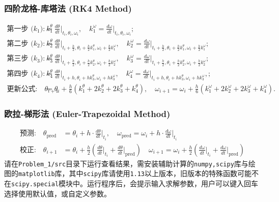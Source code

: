 \subsubsection{四阶龙格-库塔法 (RK4 Method)}

\[
\begin{aligned}
\text{第一步 (\(k_1\)):} \quad
k_1^\theta &= \frac{d\theta}{dt} \bigg|_{t_i, \theta_i, \omega_i}, \quad
k_1^\omega = \frac{d\omega}{dt} \bigg|_{t_i, \theta_i, \omega_i}; \\
\text{第二步 (\(k_2\)):} \quad
k_2^\theta &= \frac{d\theta}{dt} \bigg|_{t_i + \frac{h}{2}, \theta_i + \frac{h}{2} k_1^\theta, \omega_i + \frac{h}{2} k_1^\omega}, \quad 
k_2^\omega = \frac{d\omega}{dt} \bigg|_{t_i + \frac{h}{2}, \theta_i + \frac{h}{2} k_1^\theta, \omega_i + \frac{h}{2} k_1^\omega}; \\
\text{第三步 (\(k_3\)):} \quad
k_3^\theta &= \frac{d\theta}{dt} \bigg|_{t_i + \frac{h}{2}, \theta_i + \frac{h}{2} k_2^\theta, \omega_i + \frac{h}{2} k_2^\omega}, \quad
k_3^\omega = \frac{d\omega}{dt} \bigg|_{t_i + \frac{h}{2}, \theta_i + \frac{h}{2} k_2^\theta, \omega_i + \frac{h}{2} k_2^\omega}; \\
\text{第四步 (\(k_4\)):} \quad
k_4^\theta &= \frac{d\theta}{dt} \bigg|_{t_i + h, \theta_i + h k_3^\theta, \omega_i + h k_3^\omega}, \quad
k_4^\omega = \frac{d\omega}{dt} \bigg|_{t_i + h, \theta_i + h k_3^\theta, \omega_i + h k_3^\omega},;\\
\text{更新公式:} \quad
\theta_{i+1} &= \theta_i + \frac{h}{6} \left(k_1^\theta + 2k_2^\theta + 2k_3^\theta + k_4^\theta \right), \quad
\omega_{i+1} = \omega_i + \frac{h}{6} \left(k_1^\omega + 2k_2^\omega + 2k_3^\omega + k_4^\omega \right).
\end{aligned}
\]

\subsubsection{欧拉-梯形法 (Euler-Trapezoidal Method)}

\[
\begin{aligned}
\text{预测:} \quad
\theta_{\text{pred}} &= \theta_i + h \cdot \frac{d\theta}{dt} \bigg|_{t_i}, \quad
\omega_{\text{pred}} = \omega_i + h \cdot \frac{d\omega}{dt} \bigg|_{t_i} \\
\text{校正:} \quad
\theta_{i+1} &= \theta_i + \frac{h}{2} \left( \frac{d\theta}{dt} \bigg|_{t_i} + \frac{d\theta}{dt} \bigg|_{\text{pred}} \right) \quad
\omega_{i+1} = \omega_i + \frac{h}{2} \left( \frac{d\omega}{dt} \bigg|_{t_i} + \frac{d\omega}{dt} \bigg|_{\text{pred}} \right)
\end{aligned}
\]
请在\texttt{Problem\_1/src}目录下运行查看结果，需安装辅助计算的\texttt{numpy,scipy}库与绘图的\texttt{matplotlib}库，其中\texttt{scipy}库请使用\texttt{1.13}以上版本，旧版本的特殊函数可能不在\texttt{scipy.special}模块中。运行程序后，会提示输入求解参数，用户可以键入回车选择使用默认值，或自定义参数。
